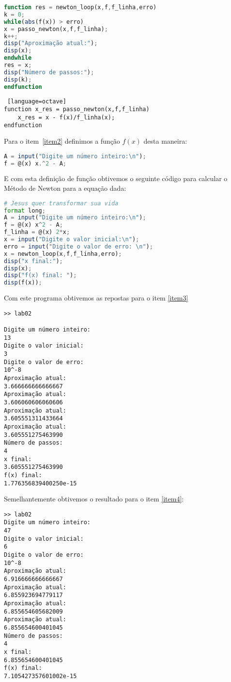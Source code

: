 \documentclass[a4paper]{article}
\begin{document}
\begin{lstlisting}[language = octave]
function res = newton_loop(x,f,f_linha,erro)
k = 0;
while(abs(f(x)) > erro)
x = passo_newton(x,f,f_linha);
k++;
disp("Aproximação atual:");
disp(x);
endwhile
res = x;
disp("Número de passos:");
disp(k);
endfunction
\end{lstlisting}
\begin{lstlisting} [language=octave]
function x_res = passo_newton(x,f,f_linha)
	x_res = x - f(x)/f_linha(x);
endfunction
\end{lstlisting}
Para o item~\ref{item2} definimos a função $f(x)$ desta maneira:
\begin{lstlisting}[language = octave]
A = input("Digite um número inteiro:\n");
f = @(x) x.^2 - A;
\end{lstlisting}

E com esta definição de função obtivemos o seguinte código para calcular o Método de Newton para a equação dada:
\begin{lstlisting}[language = octave]
# Jesus quer transformar sua vida
format long;
A = input("Digite um número inteiro:\n");
f = @(x) x^2 - A;
f_linha = @(x) 2*x;
x = input("Digite o valor inicial:\n");
erro = input("Digite o valor de erro: \n"); 
x = newton_loop(x,f,f_linha,erro);
disp("x final:");
disp(x);
disp("f(x) final: ");
disp(f(x));
\end{lstlisting}

Com este programa obtivemos as repostas para o item \ref{item3}
\begin{lstlisting}
>> lab02

Digite um número inteiro:
13
Digite o valor inicial:
3
Digite o valor de erro:
10^-8
Aproximação atual:
3.666666666666667
Aproximação atual:
3.606060606060606
Aproximação atual:
3.605551311433664
Aproximação atual:
3.605551275463990
Número de passos:
4
x final:
3.605551275463990
f(x) final:
1.776356839400250e-15
\end{lstlisting}

Semelhantemente obtivemos o resultado para o item \ref{item4}:
\begin{lstlisting}
>> lab02
Digite um número inteiro:
47
Digite o valor inicial:
6
Digite o valor de erro:
10^-8
Aproximação atual:
6.916666666666667
Aproximação atual:
6.855923694779117
Aproximação atual:
6.855654605682009
Aproximação atual:
6.855654600401045
Número de passos:
4
x final:
6.855654600401045
f(x) final:
7.105427357601002e-15
\end{lstlisting}
\end{document}
